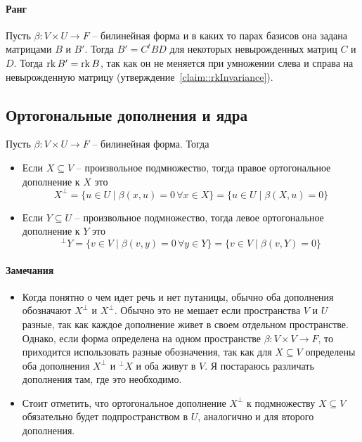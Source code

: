 \paragraph{Ранг}

Пусть $\beta\colon V\times U\to F$ -- билинейная форма и в каких то парах базисов она задана матрицами $B$ и $B'$.
Тогда $B' = C^t B D$ для некоторых невырожденных матриц $C$ и $D$.
Тогда $\operatorname{rk} B' = \operatorname{rk} B$, так как он не меняется при умножении слева и справа на невырожденную матрицу (утверждение~\ref{claim::rkInvariance}).

\subsection{Ортогональные дополнения и ядра}

\begin{definition}
Пусть $\beta\colon V\times U\to F$ -- билинейная форма.
Тогда
\begin{itemize}
\item Если $X\subseteq V$ -- произвольное подмножество, тогда правое ортогональное дополнение к $X$ это
\[
X^\bot = \{u\in U \mid \beta(x,u) = 0\,\forall x\in X\} = \{u\in U\mid \beta(X,u) = 0\}
\]

\item Если $Y\subseteq U$ -- произвольное подмножество, тогда левое ортогональное дополнение к $Y$ это
\[
{}^\bot Y = \{v\in V\mid \beta(v, y) = 0\,\forall y\in Y\} = \{v\in V\mid \beta(v, Y) = 0\}
\]
\end{itemize}
\end{definition}

\paragraph{Замечания}

\begin{itemize}
\item
Когда понятно о чем идет речь и нет путаницы, обычно оба дополнения обозначают $X^\bot$ и $X^\bot$.
Обычно это не мешает если пространства $V$ и $U$ разные, так как каждое дополнение живет в своем отдельном пространстве.
Однако, если форма определена на одном пространстве $\beta\colon V\times V\to F$, то приходится использовать разные обозначения, так как для $X\subseteq V$ определены оба дополнения $X^\bot$ и ${}^\bot X$ и оба живут в $V$.
Я постараюсь различать дополнения там, где это необходимо.

\item 
Стоит отметить, что ортогональное дополнение $X^\bot$ к подмножеству $X\subseteq V$ обязательно будет подпространством в $U$, аналогично и для второго дополнения.
\end{itemize}


